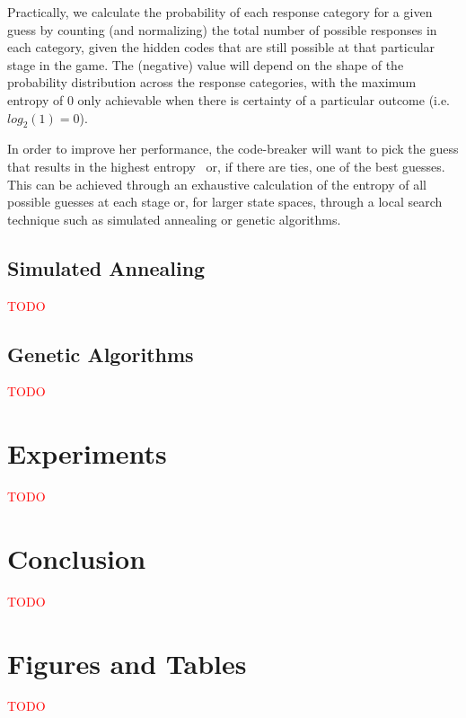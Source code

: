\documentclass[11pt]{article}
\begin{document}
Practically, we calculate the probability of each response category for a given guess by counting (and normalizing) the total number of possible responses in each category, given the hidden codes that are still possible at that particular stage in the game. The (negative) value will depend on the shape of the probability distribution across the response categories, with the maximum entropy of $0$ only achievable when there is certainty of a particular outcome (i.e. $log_2(1)=0$).

In order to improve her performance, the code-breaker will want to pick the guess that results in the highest entropy \textendash \ or, if there are ties, one of the best guesses. This can be achieved through an exhaustive calculation of the entropy of all possible guesses at each stage or, for larger state spaces, through a local search technique such as simulated annealing or genetic algorithms. 

\subsection{Simulated Annealing}

\noindent \textcolor{red}{TODO}

\subsection{Genetic Algorithms}

\noindent \textcolor{red}{TODO}

\section{Experiments}

\noindent \textcolor{red}{TODO}

\section{Conclusion}

\noindent \textcolor{red}{TODO}


\newpage
\appendix

\section{Figures and Tables}

\noindent \textcolor{red}{TODO}

\newpage

\nocite{runarsson2010adapting}
\nocite{merelo2010finding}
\nocite{doerr2013playing}
\nocite{merelo2013improving}
\nocite{snydermastermind}
\nocite{knuth76}

 

\end{document}
